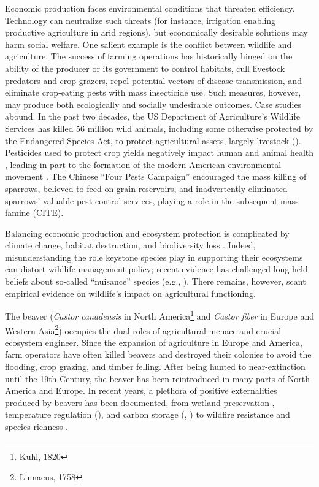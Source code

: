 

Economic production faces environmental conditions that threaten efficiency. Technology can neutralize such threats (for instance, irrigation enabling productive agriculture in arid regions), but economically desirable solutions may harm social welfare. One salient example is the conflict between wildlife and agriculture. The success of farming operations has historically hinged on the ability of the producer or its government to control habitats, cull livestock predators and crop grazers, repel potential vectors of disease transmission, and eliminate crop-eating pests with mass insecticide use. Such measures, however, may produce both ecologically and socially undesirable outcomes. Case studies abound. In the past two decades, the US Department of Agriculture's Wildlife Services has killed 56 million wild animals, including some otherwise protected by the Endangered Species Act, to protect agricultural assets, largely livestock (\cite{torrella_inside_2024}). Pesticides used to protect crop yields negatively impact human and animal health \citep{larsen_agricultural_2017}, leading in part to the formation of the modern American environmental movement \citep{woodwell_broken_1984}. The Chinese ``Four Pests Campaign'' encouraged the mass killing of sparrows, believed to feed on grain reservoirs, and inadvertently eliminated sparrows' valuable pest-control services, playing a role in the subsequent mass famine (CITE). 

Balancing economic production and ecosystem protection is complicated by climate change, habitat destruction, and biodiversity loss \citep{cardinale_biodiversity_2012}. Indeed, misunderstanding the role keystone species play in supporting their ecosystems can distort wildlife management policy; recent evidence has challenged long-held beliefs about so-called ``nuisance'' species (e.g., \cite{raynor_wolves_2021}). There remains, however, scant empirical evidence on wildlife's impact on agricultural functioning.

The beaver (\textit{Castor canadensis} in North America\footnote{Kuhl, 1820} and \textit{Castor fiber} in Europe and Western Asia\footnote{Linnaeus, 1758}) occupies the dual roles of agricultural menace and crucial ecosystem engineer. Since the expansion of agriculture in Europe and America, farm operators have often killed beavers and destroyed their colonies to avoid the flooding, crop grazing, and timber felling. After being hunted to near-extinction until the 19th Century, the beaver has been reintroduced in many parts of North America and Europe. In recent years, a plethora of positive externalities produced by beavers has been documented, from wetland preservation \citep{hood_beaver_2008}, temperature regulation (\cite{dittbrenner_relocated_2022}), and carbon storage (\cite{wohl_landscape-scale_2013}, \cite{johnston_beaver_2014}) to wildfire resistance \citep{fairfax_smokey_2020} and species richness \citep{wright_ecosystem_2002}.

